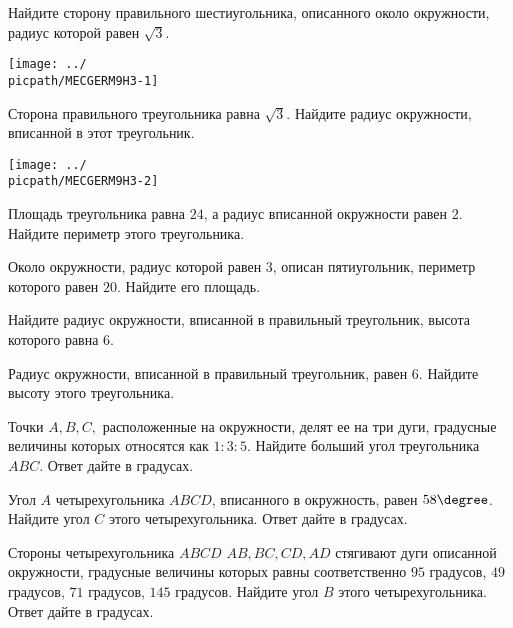 \begin{class}[number=3]
\begin{listofex}
		\item
		\begin{minipage}[t]{\bodywidth}
			Найдите сторону правильного шестиугольника, описанного около окружности, радиус которой равен \(\sqrt{3}\).
		\end{minipage}
		\hspace{0.02\linewidth}
		\begin{minipage}[t]{\picwidth}
			\texttt{[image: ../\\picpath/MECGERM9H3-1]}
		\end{minipage}
		\item
		\begin{minipage}[t]{\bodywidth}
			Сторона правильного треугольника равна \(\sqrt{3}\). Найдите радиус окружности, вписанной в этот треугольник.
		\end{minipage}
		\hspace{0.02\linewidth}
		\begin{minipage}[t]{\picwidth}
			\texttt{[image: ../\\picpath/MECGERM9H3-2]}
		\end{minipage}
		\item Площадь треугольника равна \(24\), а радиус вписанной окружности равен \(2\). Найдите периметр этого треугольника.
		\item Около окружности, радиус которой равен \(3\), описан пятиугольник, периметр которого равен \(20\). Найдите его площадь.
		\item Найдите радиус окружности, вписанной в правильный треугольник, высота которого равна \(6\).
		\item Радиус окружности, вписанной в правильный треугольник, равен \(6\). Найдите высоту этого треугольника.
		\item Точки \(A, B, C,\) расположенные на окружности, делят ее на три дуги, градусные величины которых относятся как \(1 : 3 : 5\). Найдите больший угол треугольника \(ABC\). Ответ дайте в градусах.
		\item Угол \(A\) четырехугольника \(ABCD\), вписанного в окружность, равен \(58\degree\). Найдите угол \(C\) этого четырехугольника. Ответ дайте в градусах.
		\item Стороны четырехугольника \(ABCD \) \( AB, BC, CD, AD\) стягивают дуги описанной окружности, градусные величины которых равны соответственно \(95\) градусов, \(49\) градусов, \(71\) градусов, \(145\) градусов. Найдите угол \(B\) этого четырехугольника. Ответ дайте в градусах.
	\end{listofex}
\end{class}

